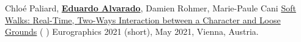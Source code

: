 \begin{cventries}
\cvpublication
    {Chlo{\'{e}} Paliard, \textbf{\underline{Eduardo Alvarado}}, Damien Rohmer, Marie-Paule Cani} %
    {\href{https://edualvarado.com/soft-walks/}{Soft {Walks}: {Real}-{Time}, {Two}-{Ways} {Interaction} between a {Character} and {Loose} {Grounds}} (\href{https://github.com/edualvarado/unity-soft-walks}{} \href{https://hal.inria.fr/hal-03200160/}{} \href{https://www.youtube.com/watch?v=76eIChGWUGw}{})} %
    {Eurographics 2021 (short), May 2021, Vienna, Austria.} %
    
\end{cventries}

